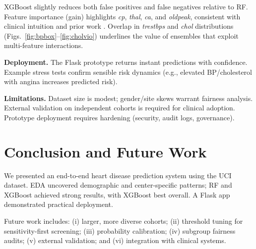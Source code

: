 \documentclass[conference]{IEEEtran}
\begin{document}
XGBoost slightly reduces both false positives and false negatives relative to RF. Feature importance (gain) highlights \textit{cp}, \textit{thal}, \textit{ca}, and \textit{oldpeak}, consistent with clinical intuition and prior work \cite{zhang2021}. Overlap in \textit{trestbps} and \textit{chol} distributions (Figs.~\ref{fig:bpbox}--\ref{fig:cholvio}) underlines the value of ensembles that exploit multi-feature interactions.

\textbf{Deployment.} The Flask prototype returns instant predictions with confidence. Example stress tests confirm sensible risk dynamics (e.g., elevated BP/cholesterol with angina increases predicted risk).

\textbf{Limitations.} Dataset size is modest; gender/site skews warrant fairness analysis. External validation on independent cohorts is required for clinical adoption. Prototype deployment requires hardening (security, audit logs, governance).

\section{Conclusion and Future Work}
We presented an end-to-end heart disease prediction system using the UCI dataset. EDA uncovered demographic and center-specific patterns; RF and XGBoost achieved strong results, with XGBoost best overall. A Flask app demonstrated practical deployment.

Future work includes: (i) larger, more diverse cohorts; (ii) threshold tuning for sensitivity-first screening; (iii) probability calibration; (iv) subgroup fairness audits; (v) external validation; and (vi) integration with clinical systems.
\end{document}

